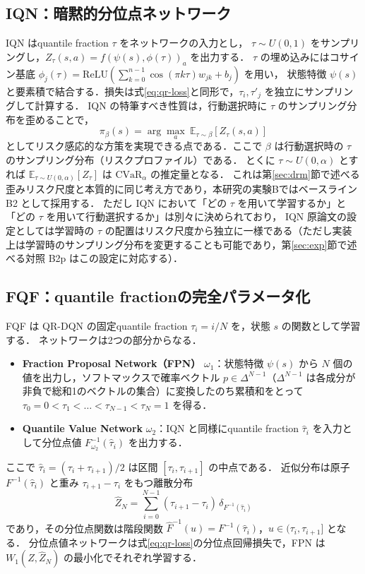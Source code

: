 \documentclass[a4paper,10pt]{jsarticle}
\theoremstyle{definition}
\newcommand{\CVaR}{\mathrm{CVaR}}
\newcommand{\Wone}{W_1}
\newcommand{\Finv}{F^{-1}}
\newcommand{\Fhinv}{\hat{F}^{-1}}
\newcommand{\E}{\mathbb{E}}
\begin{document}
\subsection{IQN：暗黙的分位点ネットワーク}
IQN \cite{dabney2018iqn} はquantile fraction $\tau$ をネットワークの入力とし，
$\tau\sim U(0,1)$ をサンプリングし，$Z_\tau(s,a)=f(\psi(s),\phi(\tau))_a$ を出力する．
$\tau$ の埋め込みにはコサイン基底 $\phi_j(\tau)=\mathrm{ReLU}\!\left(\sum_{k=0}^{n-1}\cos(\pi k\tau)w_{jk}+b_j\right)$ を用い，
状態特徴 $\psi(s)$ と要素積で結合する．損失は式\eqref{eq:qr-loss}と同形で，$\tau_i,\tau'_j$ を独立にサンプリングして計算する．
IQN の特筆すべき性質は，行動選択時に $\tau$ のサンプリング分布を歪めることで，
\begin{equation}
  \pi_\beta(s)=\arg\max_a\ \E_{\tau\sim\beta}\left[Z_\tau(s,a)\right]
\end{equation}
としてリスク感応的な方策を実現できる点である．ここで $\beta$ は行動選択時の $\tau$ のサンプリング分布（リスクプロファイル）である．
とくに $\tau\sim U(0,\alpha)$ とすれば $\E_{\tau\sim U(0,\alpha)}[Z_\tau]$ は $\CVaR_\alpha$ の推定量となる．
これは第\ref{sec:drm}節で述べる歪みリスク尺度と本質的に同じ考え方であり，本研究の実験Bではベースライン B2 として採用する．
ただし IQN において「どの $\tau$ を用いて学習するか」と「どの $\tau$ を用いて行動選択するか」は別々に決められており，
IQN 原論文の設定としては学習時の $\tau$ の配置はリスク尺度から独立に一様である（ただし実装上は学習時のサンプリング分布を変更することも可能であり，第\ref{sec:exp}節で述べる対照 B2p はこの設定に対応する）．

\subsection{FQF：quantile fractionの完全パラメータ化}
\label{subsec:fqf}
FQF \cite{yang2019fqf} は QR-DQN の固定quantile fraction $\tau_i=i/N$ を，状態 $s$ の関数として学習する．
ネットワークは2つの部分からなる．
\begin{itemize}
  \item \textbf{Fraction Proposal Network（FPN）} $\omega_1$：状態特徴 $\psi(s)$ から $N$ 個の値を出力し，ソフトマックスで確率ベクトル $p\in\Delta^{N-1}$（$\Delta^{N-1}$ は各成分が非負で総和1のベクトルの集合）に変換したのち累積和をとって
  $\tau_0=0<\tau_1<\dots<\tau_{N-1}<\tau_N=1$ を得る．
  \item \textbf{Quantile Value Network} $\omega_2$：IQN と同様にquantile fraction $\hat\tau_i$ を入力として分位点値 $\Finv_{\omega_2}(\hat\tau_i)$ を出力する．
\end{itemize}
ここで $\hat\tau_i=(\tau_i+\tau_{i+1})/2$ は区間 $[\tau_i,\tau_{i+1}]$ の中点である．
近似分布は原子 $\Finv(\hat\tau_i)$ と重み $\tau_{i+1}-\tau_i$ をもつ離散分布
\begin{equation}
  \hat Z_N=\sum_{i=0}^{N-1}(\tau_{i+1}-\tau_i)\,\delta_{\Finv(\hat\tau_i)}
  \label{eq:zhat}
\end{equation}
であり，その分位点関数は階段関数 $\Fhinv(u)=\Finv(\hat\tau_i)$，$u\in(\tau_i,\tau_{i+1}]$ となる．
分位点値ネットワークは式\eqref{eq:qr-loss}の分位点回帰損失で，FPN は $\Wone(Z,\hat Z_N)$ の最小化でそれぞれ学習する．
\end{document}
